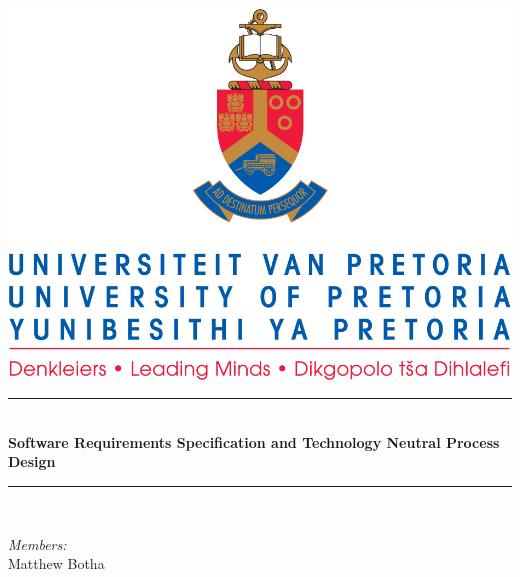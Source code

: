 \documentclass{article}
\begin{document}
	
\begin{titlepage}
	\newcommand{\HRule}{\rule{\linewidth}{0.5mm}} %

	\center %
	 

	\includegraphics[width=\textwidth]{front-page}


	\HRule \\[0.4cm]
	{ \huge \bfseries Software Requirements Specification
	and
	Technology Neutral Process Design}\\[0.4cm] %
	\HRule \\[1.5cm]
	 

	\begin{minipage}{0.4\textwidth}
	\begin{flushleft} \large
	\emph{Members:}\\%
	Matthew Botha


\end{flushleft}
\end{minipage}
\end{titlepage}
\end{document}
